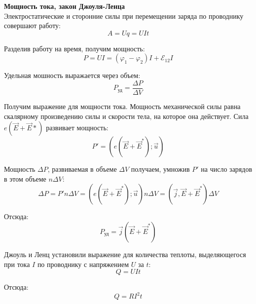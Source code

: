 \documentclass{article}
\begin{document}
	
	\textbf{Мощность тока, закон Джоуля-Ленца}\\

	Электростатические и сторонние силы при перемещении заряда по проводнику совершают работу:
	\begin{equation}
		A = Uq = UIt
	\end{equation}

	Разделив работу на время, получим мощность:
	\begin{equation}
		P = UI = (\varphi_1-\varphi_2)I + \mathcal{E}_{12}I
	\end{equation}

	Удельная мошность выражается через объем:
	\begin{equation}
		P_{\text{уд}} = \frac{\Delta P}{\Delta V}
	\end{equation}

	Получим выражение для мощности тока. Мощность механической силы равна скалярному произведению силы и скорости тела, на которое она действует. Сила $e(\vec E + \vec E*)$ развивает мощность:
	\begin{equation}
		P' = (e(\vec E + \vec E^*);\vec u)
	\end{equation}

	Мощность $\Delta P$, развиваемая в объеме $\Delta V$ получаем, умножив $P'$ на число зарядов в этом объеме $n\Delta V$:
	\begin{equation}
		\Delta P = P'n\Delta V = (e(\vec E + \vec E^*);\vec u) n\Delta V = (\vec j,\vec E + \vec E^*)\Delta V
	\end{equation}

	Отсюда:
	\begin{equation}
		P_{\text{уд}} = \vec j(\vec E + \vec E^*)
	\end{equation}

	Джоуль и Ленц установили выражение для количества теплоты, выделяющегося при тока $I$ по проводнику с напряжением $U$ за $t$:
	\begin{equation}
		Q = UIt
	\end{equation}

	Отсюда:
	\begin{equation}
		Q = RI^2 t
	\end{equation}
\end{document}
